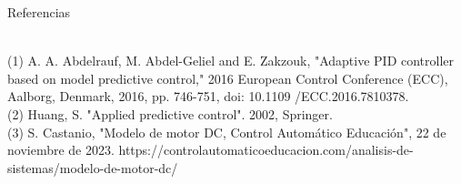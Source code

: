 \documentclass{beamer}
\begin{document}
\begin{frame}{Referencias}
\begin{justify}
\vspace{0.3cm}
\begin{itemize}  
\\
(1)  A. A. Abdelrauf, M. Abdel-Geliel and E. Zakzouk, "Adaptive PID controller based on model predictive control," 2016 European Control Conference (ECC), Aalborg, Denmark, 2016, pp. 746-751, doi: 10.1109 /ECC.2016.7810378.
\\
(2) Huang, S. "Applied predictive control". 2002, Springer. 
\\
(3) S. Castanio, "Modelo de motor DC, Control Automático Educación", 22 de noviembre de 2023. https://controlautomaticoeducacion.com/analisis-de-sistemas/modelo-de-motor-dc/
\end{itemize}
\end{justify}
\end{frame}
\end{document}
